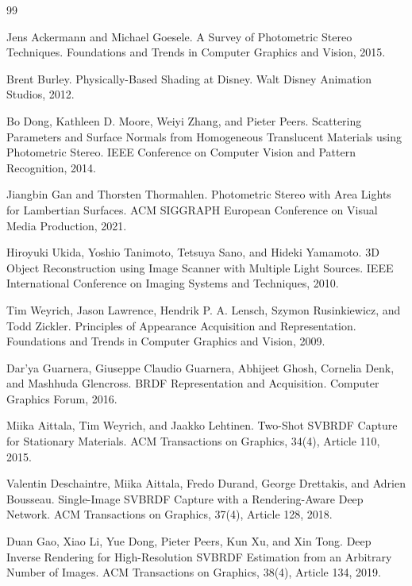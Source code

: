 \documentclass[11pt, twoside, listof=totocnumbered, bibliography=totocnumbered]{scrartcl}
\begin{document}
	\newpage
	\begin{thebibliography}{99}
		
		Jens Ackermann and Michael Goesele.
		\newblock A Survey of Photometric Stereo Techniques.
		\newblock Foundations and Trends in Computer Graphics and Vision, 2015.
		
		Brent Burley.
		\newblock Physically-Based Shading at Disney.
		\newblock Walt Disney Animation Studios, 2012.
		
		Bo Dong, Kathleen D. Moore, Weiyi Zhang, and Pieter Peers.
		\newblock Scattering Parameters and Surface Normals from Homogeneous Translucent Materials using Photometric Stereo.
		\newblock IEEE Conference on Computer Vision and Pattern Recognition, 2014.
		
		Jiangbin Gan and Thorsten Thormahlen.
		\newblock Photometric Stereo with Area Lights for Lambertian Surfaces.
		\newblock ACM SIGGRAPH European Conference on Visual Media Production, 2021.
		
		Hiroyuki Ukida, Yoshio Tanimoto, Tetsuya Sano, and Hideki Yamamoto.
		\newblock 3D Object Reconstruction using Image Scanner with Multiple Light Sources.
		\newblock IEEE International Conference on Imaging Systems and Techniques, 2010.
		
		Tim Weyrich, Jason Lawrence, Hendrik P. A. Lensch, Szymon Rusinkiewicz, and Todd Zickler.
		\newblock Principles of Appearance Acquisition and Representation.
		\newblock Foundations and Trends in Computer Graphics and Vision, 2009.
		
		Dar'ya Guarnera, Giuseppe Claudio Guarnera, Abhijeet Ghosh, Cornelia Denk, and Mashhuda Glencross.
		\newblock BRDF Representation and Acquisition.
		\newblock Computer Graphics Forum, 2016.
		
		Miika Aittala, Tim Weyrich, and Jaakko Lehtinen.
		\newblock Two-Shot SVBRDF Capture for Stationary Materials.
		\newblock ACM Transactions on Graphics, 34(4), Article 110, 2015.
		
		Valentin Deschaintre, Miika Aittala, Fredo Durand, George Drettakis, and Adrien Bousseau.
		\newblock Single-Image SVBRDF Capture with a Rendering-Aware Deep Network.
		\newblock ACM Transactions on Graphics, 37(4), Article 128, 2018.
		
		Duan Gao, Xiao Li, Yue Dong, Pieter Peers, Kun Xu, and Xin Tong.
		\newblock Deep Inverse Rendering for High-Resolution SVBRDF Estimation from an Arbitrary Number of Images.
		\newblock ACM Transactions on Graphics, 38(4), Article 134, 2019.
		

\end{thebibliography}
\end{document}
